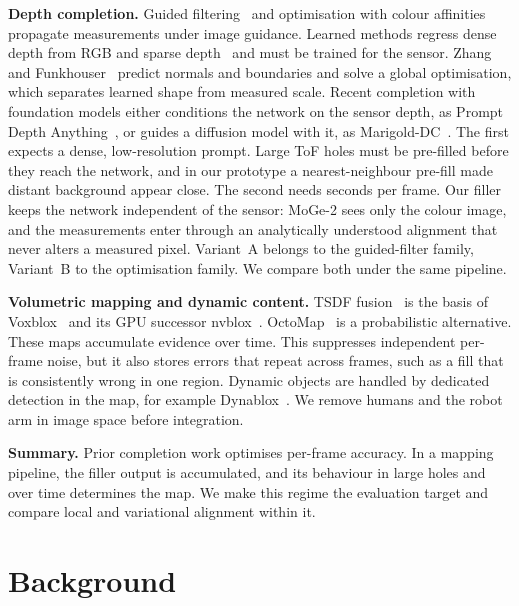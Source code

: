 \documentclass[conference]{IEEEtran}
\begin{document}
\textbf{Depth completion.}
Guided filtering~\cite{he2013guided} and optimisation with colour
affinities~\cite{levin2004colorization,barron2016bilateral} propagate
measurements under image guidance. Learned methods regress dense depth from
RGB and sparse depth~\cite{uhrig2017sparsity,ma2018sparse,park2020nlspn} and
must be trained for the sensor. Zhang and
Funkhouser~\cite{zhang2018deepcompletion} predict normals and boundaries and
solve a global optimisation, which separates learned shape from measured
scale. Recent completion with foundation models either conditions the network
on the sensor depth, as Prompt Depth Anything~\cite{lin2025promptda}, or
guides a diffusion model with it, as Marigold-DC~\cite{viola2024marigolddc}.
The first expects a dense, low-resolution prompt. Large ToF holes must be
pre-filled before they reach the network, and in our prototype a
nearest-neighbour pre-fill made distant background appear close. The second
needs seconds per frame. Our filler keeps the network independent of the
sensor: MoGe-2 sees only the colour image, and the measurements enter through
an analytically understood alignment that never alters a measured pixel.
Variant~A belongs to the guided-filter family, Variant~B to the optimisation
family. We compare both under the same pipeline.

\textbf{Volumetric mapping and dynamic content.}
TSDF fusion~\cite{curless1996volumetric,newcombe2011kinectfusion} is the basis
of Voxblox~\cite{oleynikova2017voxblox} and its GPU successor
nvblox~\cite{millane2024nvblox}. OctoMap~\cite{hornung2013octomap} is a
probabilistic alternative. These maps accumulate evidence over time. This
suppresses independent per-frame noise, but it also stores errors that repeat
across frames, such as a fill that is consistently wrong in one region. Dynamic
objects are handled by dedicated detection in the map, for example
Dynablox~\cite{schmid2023dynablox}. We remove humans and the robot arm in image
space before integration.

\textbf{Summary.} Prior completion work optimises per-frame accuracy. In a
mapping pipeline, the filler output is accumulated, and its behaviour in large
holes and over time determines the map. We make this regime the evaluation
target and compare local and variational alignment within it.

\section{Background}
\label{sec:background}
\end{document}
